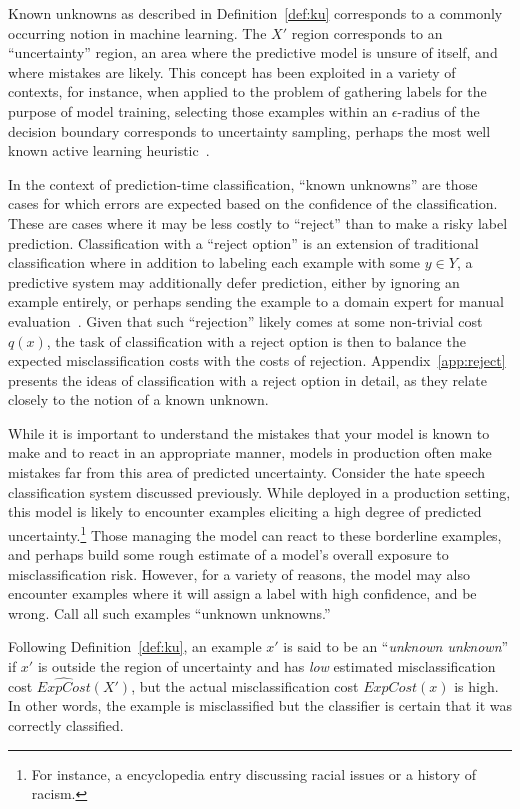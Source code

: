 Known unknowns as described in Definition~\ref{def:ku} corresponds to a commonly occurring notion in machine learning. The $X'$ region corresponds to an ``uncertainty'' region, an area where the predictive model is unsure of itself, and where mistakes are likely. This concept has been exploited in a variety of contexts, for instance, when applied to the problem of gathering labels for the purpose of model training, selecting those examples within an $\epsilon$-radius of the decision boundary corresponds to uncertainty sampling, perhaps the most well known active learning heuristic~\cite{lewis94sequential}.

In the context of prediction-time classification, ``known unknowns'' are those cases for which errors are expected based on the confidence of the classification.   These are cases where it may be less costly to ``reject'' than to make a risky label prediction.  Classification with a ``reject option'' is an extension of traditional classification where in addition to labeling each example with some $y \in Y$, a predictive system may additionally defer prediction, either by ignoring an example entirely, or perhaps sending the example to a domain expert for manual evaluation~\cite{chow:57,chow:70}. Given that such ``rejection'' likely comes at some non-trivial cost $q(x)$, the task of classification with a reject option is then to balance the expected misclassification costs with the costs of rejection.  Appendix~\ref{app:reject} presents the ideas of classification with a reject option in detail, as they relate closely to the notion of a known unknown.

While it is important to understand the mistakes that your model is known to make and to react in an appropriate manner, models in production often make mistakes far from this area of predicted uncertainty. Consider the hate speech classification system discussed previously. While deployed in a production setting, this model is likely to encounter examples eliciting a high degree of predicted uncertainty.\footnote{For instance, a encyclopedia entry discussing racial issues or a history of racism.} Those managing the model can react to these borderline examples, and perhaps build some rough estimate of a model's overall exposure to misclassification risk. However, for a variety of reasons, the model may also encounter examples where it will assign a label with high confidence, and be wrong. Call all such examples ``unknown unknowns.''

\begin{definition}
\label{def:uu}
Following Definition~\ref{def:ku}, an example $x'$ is said to be an ``\emph{unknown unknown}'' if $x'$ is outside the region of uncertainty and has \emph{low} estimated misclassification cost $\widehat{\mathit{ExpCost}}(X')$, but the actual misclassification cost $\mathit{ExpCost}(x)$ is high. In other words, the example is misclassified but the classifier is certain that it was correctly classified.
\end{definition}

